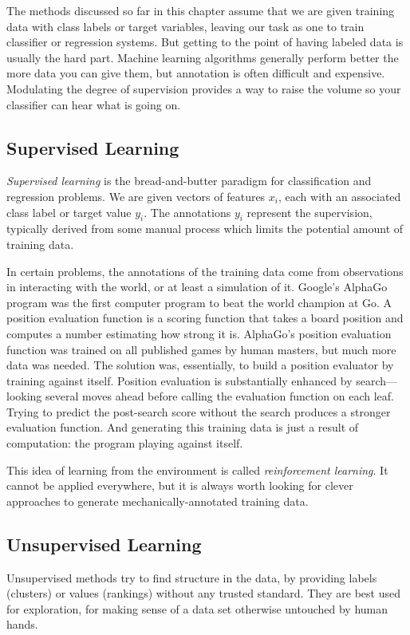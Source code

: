 \documentclass[10pt]{article}
\begin{document}
\begin{enumerate}
The methods discussed so far in this chapter assume that we are given training data with class labels or target variables, leaving our task as one to train classifier or regression systems. But getting to the point of having labeled data is usually the hard part. Machine learning algorithms generally perform better the more data you can give them, but annotation is often difficult and expensive. Modulating the degree of supervision provides a way to raise the volume so your classifier can hear what is going on.

\subsection{Supervised Learning}
\textit{Supervised learning} is the bread-and-butter paradigm for classification and regression problems. We are given vectors of features $x_{i}$, each with an associated class label or target value $y_{i}$. The annotations $y_{i}$ represent the supervision, typically derived from some manual process which limits the potential amount of training data.

In certain problems, the annotations of the training data come from observations in interacting with the world, or at least a simulation of it. Google's AlphaGo program was the first computer program to beat the world champion at Go. A position evaluation function is a scoring function that takes a board position and computes a number estimating how strong it is. AlphaGo's position evaluation function was trained on all published games by human masters, but much more data was needed. The solution was, essentially, to build a position evaluator by training against itself. Position evaluation is substantially enhanced by search—looking several moves ahead before calling the evaluation function on each leaf. Trying to predict the post-search score without the search produces a stronger evaluation function. And generating this training data is just a result of computation: the program playing against itself.

This idea of learning from the environment is called \textit{reinforcement learning}. It cannot be applied everywhere, but it is always worth looking for clever approaches to generate mechanically-annotated training data.

\subsection{Unsupervised Learning}
Unsupervised methods try to find structure in the data, by providing labels (clusters) or values (rankings) without any trusted standard. They are best used for exploration, for making sense of a data set otherwise untouched by human hands.


\end{enumerate}
\end{document}
